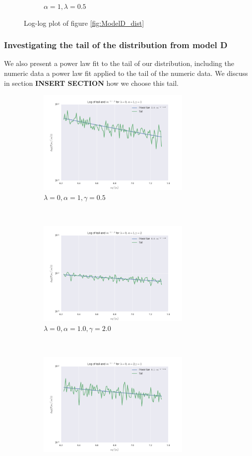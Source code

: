 \documentclass[a4paper, 10pt]{article}
\begin{document}
\begin{figure}[!ht]
\begin{subfigure}[H!]{0.5\textwidth}
        \caption{$\alpha = 1, \lambda=0.5$}
    \end{subfigure}
\caption{Log-log plot of figure \ref{fig:ModelD_dist}} \label{fig:ModelD_dist_log}
\end{figure}


\subsubsection{Investigating the tail of the distribution from model D}
We also present a power law fit to the tail of our distribution, including the numeric data a power law fit applied to the tail of the numeric data. We discuss in section \textbf{INSERT SECTION} how we choose this tail. 
\begin{figure}[!ht] %
    \begin{subfigure}[H!]{0.5\textwidth}
        \centering
        \includegraphics[height=2.0in]{tailL0A1G1.png} %
        \caption{$\lambda=0, \alpha=1, \gamma = 0.5$}
    \end{subfigure}%
    ~ 
    \begin{subfigure}[H!]{0.5\textwidth}
        \centering
        \includegraphics[height=2.0in]{tailL0A1G2.png}
        \caption{$\lambda = 0, \alpha = 1.0, \gamma=2.0$}
    \end{subfigure}
     ~
    \begin{subfigure}[H!]{0.5\textwidth}
        \centering
        \includegraphics[height=2.0in]{tailL0A2G1.png}

\end{subfigure}
\end{figure}
\end{document}
